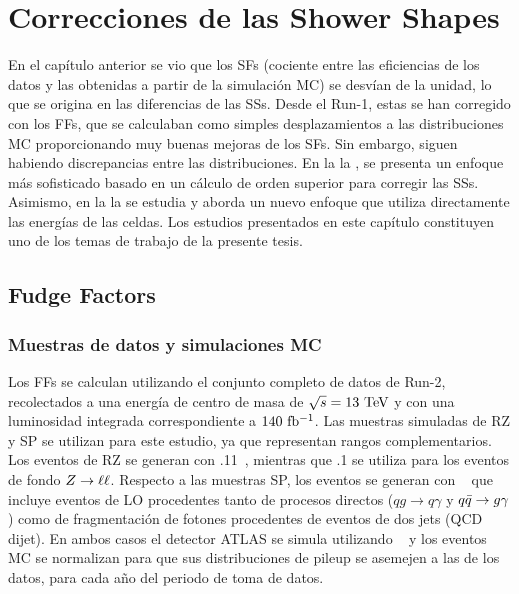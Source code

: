 \chapter{Correcciones de las Shower Shapes}
\label{ch:ss_corrections}


En el capítulo anterior se vio que los \acp{SF} (cociente entre las eficiencias de los datos y las obtenidas a partir de la simulación \ac{MC}) se desvían de la unidad, lo que se origina en las diferencias de las \acfp{SS}. Desde el Run-1, estas se han corregido con los \acfp{FF}, que se calculaban como simples desplazamientos a las distribuciones \ac{MC} proporcionando muy buenas mejoras de los \acp{SF}. Sin embargo, siguen habiendo discrepancias entre las distribuciones.
En la la \Sect{\ref{sec:ss_corrections:ffs}}, se presenta un enfoque más sofisticado basado en un cálculo de orden superior para corregir las \acp{SS}. Asimismo, en la la \Sect{\ref{sec:ss_corrections:cell_rw}} se estudia y aborda un nuevo enfoque que utiliza directamente las energías de las celdas. Los estudios presentados en este capítulo constituyen uno de los temas de trabajo de la presente tesis.





\section{Fudge Factors}
\label{sec:ss_corrections:ffs}


\subsection{Muestras de datos y simulaciones MC}
\label{subsec:ss_corrections:ffs:samples}

Los \acp{FF} se calculan utilizando el conjunto completo de datos de Run-2, recolectados a una energía de centro de masa de \(\sqrt{s}=13~\tev\) y con una luminosidad integrada correspondiente a \(140~\ifb\).
Las muestras simuladas de \ac{RZ} y \ac{SP} se utilizan para este estudio, ya que representan rangos \pt complementarios. Los eventos de \ac{RZ} se generan con .11~\cite{Sherpa2.2}, mientras que .1 se utiliza para los eventos de fondo \(\Zboson \to \ell\ell\). Respecto a las muestras \ac{SP}, los eventos se generan con ~\cite{Pythia8.1} que incluye eventos \gammajet de \acf{LO} procedentes tanto de procesos directos (\(qg\to q\gamma\) y \(\qqbar \to g \gamma\)) como de fragmentación de fotones procedentes de eventos de dos jets (\ac{QCD} dijet).
En ambos casos el detector \ac{ATLAS} se simula utilizando \GEANT~\cite{Geant4} y los eventos \ac{MC} se normalizan para que sus distribuciones de pileup se asemejen a las de los datos, para cada año del periodo de toma de datos.


